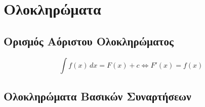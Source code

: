 


\usepackage{xspace}
\everymath{\displaystyle}






\section{Ολοκληρώματα}

\subsection{Ορισμός Αόριστου Ολοκληρώματος}

\[
  \int f(x)\, dx = F(x) + c \Leftrightarrow F'(x) = f(x)
\]

\subsection{Ολοκληρώματα Βασικών Συναρτήσεων}

